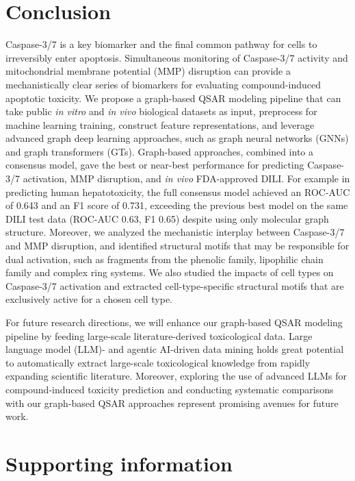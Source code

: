 \documentclass[letterpaper]{article}
\begin{document}
\section{Conclusion}

Caspase-3/7 is a key biomarker and the final common pathway for cells to irreversibly enter apoptosis. Simultaneous monitoring of Caspase-3/7 activity and mitochondrial membrane potential (MMP) disruption can provide a mechanistically clear series of biomarkers for evaluating compound-induced apoptotic toxicity. We propose a graph-based QSAR modeling pipeline that can take public \emph{in vitro} and \emph{in vivo} biological datasets as input, preprocess for machine learning training, construct feature representations, and leverage advanced graph deep learning approaches, such as graph neural networks (GNNs) and graph transformers (GTs). Graph-based approaches, combined into a consensus model, gave the best or near-best performance for predicting Caspase-3/7 activation, MMP disruption, and \emph{in vivo} FDA-approved DILI. For example in predicting human hepatotoxicity, the full consensus model achieved an ROC-AUC of 0.643 and an F1 score of 0.731, exceeding the previous best model on the same DILI test data (ROC-AUC 0.63, F1 0.65) despite using only molecular graph structure. Moreover, we analyzed the mechanistic interplay between Caspase-3/7 and MMP disruption, and identified structural motifs that may be responsible for dual activation, such as fragments from the phenolic family, lipophilic chain family and complex ring systems. We also studied the impacts of cell types on Caspase-3/7 activation and extracted cell-type-specific structural motifs that are exclusively active for a chosen cell type.

For future research directions, we will enhance our graph-based QSAR modeling pipeline by feeding large-scale literature-derived toxicological data. Large language model (LLM)- and agentic AI-driven data mining holds great potential to automatically extract large-scale toxicological knowledge from rapidly expanding scientific literature. Moreover, exploring the use of advanced LLMs for compound-induced toxicity prediction and conducting systematic comparisons with our graph-based QSAR approaches represent promising avenues for future work.

\section*{Supporting information}
\end{document}
